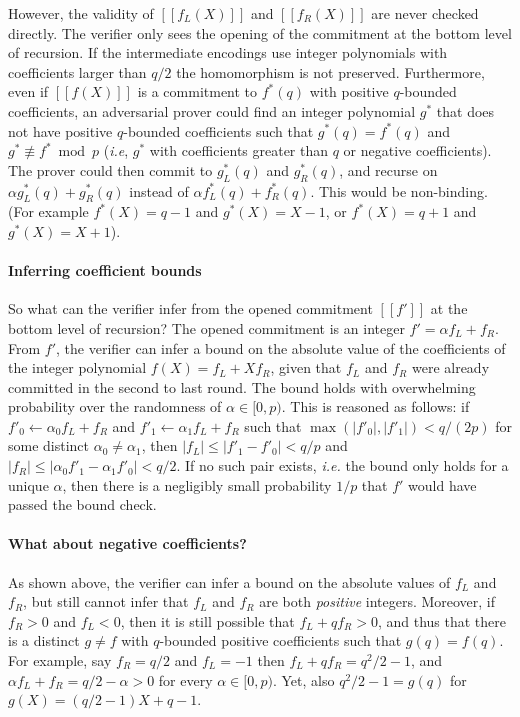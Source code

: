 However, the validity of $[\![f_L(X)]\!]$ and $[\![f_R(X)]\!]$ are never checked directly. 
The verifier only sees the opening of the commitment at the bottom level of recursion. If the intermediate encodings use integer polynomials with coefficients larger than $q/2$ the homomorphism is not preserved. Furthermore, even if $[\![f(X)]\!]$ is a commitment to $f^*(q)$ with positive $q$-bounded coefficients, an adversarial prover could find an integer polynomial $g^*$ that does not have positive $q$-bounded coefficients such that $g^*(q) = f^*(q)$ and $g^* \not\equiv f^* \bmod p$ (\emph{i.e}, $g^*$ with coefficients greater than $q$ or negative coefficients). 
The prover could then commit to $g^*_L(q)$ and $g^*_R(q)$, and recurse on $\alpha g^*_L(q) + g^*_R(q)$ instead of $\alpha f^*_L(q) + f^*_R(q)$. This would be non-binding. (For example $f^*(X)= q-1$ and $g^*(X)=X-1$, or $f^*(X) = q +1$ and $g^*(X) = X + 1$). 

\paragraph{Inferring coefficient bounds} So what can the verifier infer from the opened commitment $[\![f']\!]$ at the bottom level of recursion? The opened commitment is an integer $f' = \alpha f_L + f_R$. From $f'$, the verifier can infer a bound on the absolute value of the coefficients of the integer polynomial $f(X) = f_L + X f_R$, given that $f_L$ and $f_R$ were already committed in the second to last round. The bound holds with overwhelming probability over the randomness of $\alpha \in [0,p)$. This is reasoned as follows: if $f'_0 \leftarrow \alpha_0 f_L + f_R$ and $f'_1 \leftarrow \alpha_1 f_L + f_R$ such that $\max(|f'_0|, |f'_1|) < q / (2p)$ for some distinct $\alpha_0 \neq \alpha_1$, then $|f_L| \leq |f'_1 - f'_0| < q / p$ and $|f_R| \leq |\alpha_0 f'_1 - \alpha_1 f'_0| < q/2$. If no such pair exists, \emph{i.e.} the bound only holds for a unique $\alpha$, then there is a negligibly small probability $1/p$ that $f'$ would have passed the bound check.


\paragraph{What about negative coefficients?} 
As shown above, the verifier can infer a bound on the absolute values of $f_L$ and $f_R$, but still cannot infer that $f_L$ and $f_R$ are both \emph{positive} integers. Moreover, if $f_R > 0$ and $f_L < 0$, then it is still possible that $f_L + q f_R > 0$, and thus that there is a distinct $g \neq f$ with $q$-bounded positive coefficients such that $g(q) = f(q)$. For example, say $f_R = q/2$ and $f_L = -1$ then $f_L + q f_R = q^2/2 - 1$, and $\alpha f_L + f_R  = q/2 - \alpha > 0$ for every $\alpha \in [0,p)$. Yet, also $q^2/2 - 1 = g(q)$ for $g(X) = (q/2 - 1)X + q-1$. 

